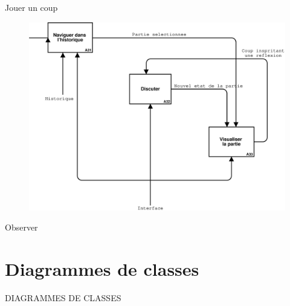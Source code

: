 \documentclass[french,12pt]{report}
\begin{document}
\begin{center}
Jouer un coup

\pagebreak

\begin{figure}[h]
\includegraphics[width=16cm]{A3.eps}
\end{figure}

Observer

\end{center}

\pagebreak

\section*{Diagrammes de classes}
{\uppercase{Diagrammes de classes}}
\end{document}
